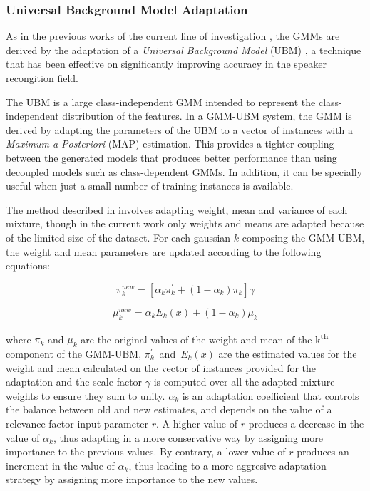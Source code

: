 \subsubsection{Universal Background Model Adaptation}

As in the previous works of the current line of investigation
\cite{detection_phone_level_mispronunciation_learning, main},
the GMMs are derived by the adaptation of a \textit{Universal Background Model} (UBM)
\cite{ubm_adaptation}, a technique that has been effective on significantly improving
accuracy in the speaker recongition field.

The UBM is a large class-independent GMM intended to represent the class-independent distribution
of the features. In a GMM-UBM system, the GMM is derived by adapting the parameters of the UBM
to a vector of instances with a \textit{Maximum a Posteriori} (MAP) estimation. This provides a
tighter coupling between the generated models that produces better performance than using
decoupled models such as class-dependent GMMs. In addition, it can be specially useful when
just a small number of training instances is available.

The method described in \cite{ubm_adaptation} involves adapting weight, mean and variance of each
mixture, though in the current work only weights and means are adapted because of the limited
size of the dataset. For each gaussian $k$ composing the GMM-UBM, the weight and mean parameters
are updated according to the following equations:

\begin{equation}
  \pi_{k}^{new} = [\alpha_{k} \pi_{k}^{'} + (1-\alpha_{k}) \pi_{k}]\gamma
\end{equation}

\begin{equation}
  \mu_{k}^{new} = \alpha_{k} E_{k}(x) + (1-\alpha_{k})\mu_{k}
\end{equation}

where $\pi_{k}$ and $\mu_{k}$ are the original values of the weight and mean of the
k\textsuperscript{th} component of the GMM-UBM, \mbox{$\pi_{k}^{'}$ and $E_{k}(x)$} are
the estimated values for the weight and mean calculated on the vector of instances provided
for the adaptation and the scale factor $\gamma$ is computed over all the
adapted mixture weights to ensure they sum to unity. $\alpha_{k}$ is an adaptation
coefficient that controls the balance between old and new estimates, and depends on the value of
a relevance factor input parameter $r$. A higher value of $r$ produces a decrease in the value
of $\alpha_{k}$, thus adapting in a more conservative way by assigning more importance
to the previous values. By contrary, a lower value of $r$ produces an increment in the value
of $\alpha_{k}$, thus leading to a more aggresive adaptation strategy by assigning more importance
to the new values. %


